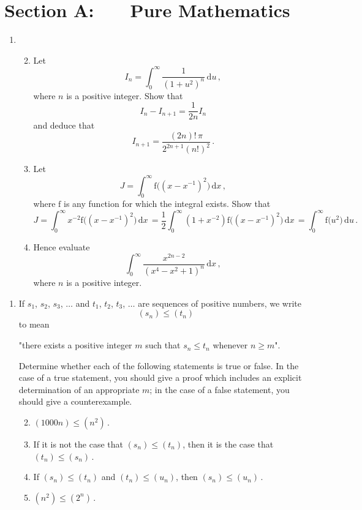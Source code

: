 \documentclass[a4, 11pt]{report}
\newlength{\qspace}
\newcounter{qnumber}
\newenvironment{question}%
 {\vspace{\qspace}
  \begin{enumerate}[\bfseries 1\quad][10]%
    \setcounter{enumi}{\value{qnumber}}%
    \item%
 }
{
  \end{enumerate}
  \filbreak
  \stepcounter{qnumber}
 }
\newenvironment{questionparts}[1][1]%
 {
  \begin{enumerate}[\bfseries (i)]%
    \setcounter{enumii}{#1}
    \addtocounter{enumii}{-1}
    \setlength{\itemsep}{5mm}
    \setlength{\parskip}{8pt}
 }
 {
  \end{enumerate}
 }
\def\d{{\mathrm d}}
\def\f{{\mathrm f}}
\def\le{\leqslant}
\def\ge{\geqslant}
\renewcommand{\.}[1]{\ensuremath{\mathrm{#1}}}
\newcommand{\+}[1]{\ensuremath{\mathbf{#1}}}
\begin{document}
\setcounter{page}{2}

 
\section*{Section A: \ \ \ Pure Mathematics}

\begin{question}
\begin{questionparts}
\item Let 
\[
I_n= \int_0^\infty \frac 1 {(1+u^2)^n}\, \d u \,,
\]
where $n$ is a positive integer. Show that
\[
I_n - I_{n+1} = \frac 1 {2n} I_n
\]
and deduce that 
\[
I_{n+1} = \frac{(2n)!\, \pi}{2^{2n+1}(n!)^2} \,.
\]
\item Let 
\[
J = \int_0^\infty \f\big( (x- x^{-1})^2\big ) \, \d x \,,
\]
where $\f$ is any function for which the integral exists. Show that
\[
J =  \int_0^\infty x^{-2} \f\big( (x- x^{-1})^2\big)  \, \d x \, = \frac12  \int_0^\infty 
(1 + x^{-2}) 
\f\big( (x- x^{-1})^2\big )
\, \d x \,
= \int_0^\infty \f\big(u^2\big) \,\d u \,.
\]
\item Hence evaluate
\[
\int_0^\infty \frac {x^{2n-2}}{(x^4-x^2+1)^n} \, \d x \,,
\]
where $n$ is a positive integer.

\end{questionparts}
\end{question}

\begin{question}
 If $s_1$, $s_2$, $s_3$, $\ldots$ and $t_1$, $t_2$, $t_3$, $\ldots$ are sequences of positive numbers, we write
\[
(s_n)\le  (t_n)
\]
to mean

\begin{center}
"there exists a positive integer $m$ such that $s_n \le t_n$ whenever $n\ge m$".
\end{center}

Determine whether each of the following statements is true or false. In the case of a true statement, you should give a proof which includes an explicit determination of an  appropriate $m$; in the case of a false statement, you should give a  counterexample.



\begin{questionparts}
\item $(1000n) \le  (n^2)\,$.
\item If it is not the case that   $(s_n)\le (t_n)$, then it is the case that $(t_n)\le  (s_n)\,$.

\item If $(s_n)\le  (t_n)$ and $(t_n) \le (u_n)$, then $(s_n)\le (u_n)\,$.
\item $(n^2)\le  (2^n)\,$.   
\end{questionparts}
\end{question}
\end{document}
